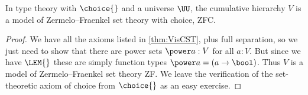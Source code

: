 %
\begin{thm}\label{thm:zfc}
In type theory with $\choice{}$ and a universe $\UU$, the cumulative hierarchy $V$ is a model of Zermelo--Fraenkel set theory with choice, ZFC.
\end{thm}

\begin{proof}
We have all the axioms listed in \cref{thm:VisCST}, plus full separation, so we just need to show that there are power sets $\power a:V$ for all $a:V$.  But since we have $\LEM{}$ these are simply function types $\power a = (a\to\bool)$.  Thus $V$ is a model of Zermelo--Fraenkel set theory ZF. We leave the verification of the set-theoretic axiom of choice from $\choice{}$ as an easy exercise.
\end{proof}

